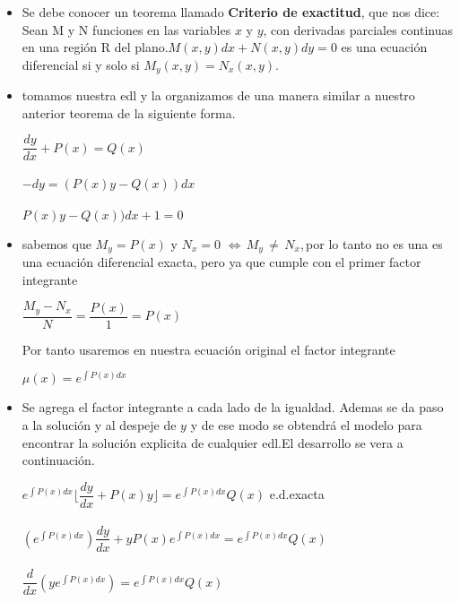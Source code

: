 \documentclass[10pt,a4paper]{article}
\begin{document}
 \begin{itemize}
 \item Se debe conocer un teorema llamado \textbf{Criterio de exactitud}, que nos dice: Sean M y N funciones en las variables $x$ y $y$, con derivadas parciales continuas en una región R del plano.$M(x,y)dx+N(x,y)dy=0$ es una ecuación diferencial si y solo si $M_y(x,y)=N_x(x,y)$.
  \item tomamos nuestra edl y la organizamos de una manera similar a nuestro anterior teorema de la siguiente forma.
 \begin{center}
 $\dfrac{dy}{dx}+P(x)=Q(x)$\\
 \,\\
 $-dy=(P(x)y-Q(x))dx$\\
  \,\\
 $P(x)y-Q(x))dx+1=0$\\
  \end{center}
  
  \item sabemos que $M_y=P(x)$ y $N_x=0$ $\Leftrightarrow$\,$M_y$\,$\neq$\,$N_x$,\,por lo tanto no es una es una ecuación diferencial exacta, pero ya que cumple con el primer factor integrante\\
  \begin{center}
  $\dfrac{M_y-N_x}{N}=\dfrac{P(x)}{1}=P(x)$
 \end{center}
Por tanto usaremos en nuestra ecuación original el factor integrante
    \begin{center}
  $\mu(x)=e^{\int P(x)dx}$
 \end{center}
 \item Se agrega el factor integrante a cada lado de la igualdad. Ademas se da paso a la solución y al despeje de $y$ y de ese modo se obtendrá el modelo para encontrar la solución explicita de cualquier edl.El desarrollo se vera a continuación.\\
 \begin{center}
 $e^{\int P(x)dx}\lfloor\dfrac{dy}{dx}+P(x)y\rfloor= e^{\int P(x)dx}Q(x)$ e.d.exacta\\
 \,\\
 $(e^{\int P(x)dx})\dfrac{dy}{dx}+yP(x)e^{\int P(x)dx}=e^{\int P(x)dx}Q(x)$\\
 \,\\
 $\dfrac{d}{dx}(ye^{\int P(x)dx})=e^{\int P(x)dx}Q(x)$\\
 
 \vspace{1cm}
 
 \end{center}
 

\end{itemize}
\end{document}
